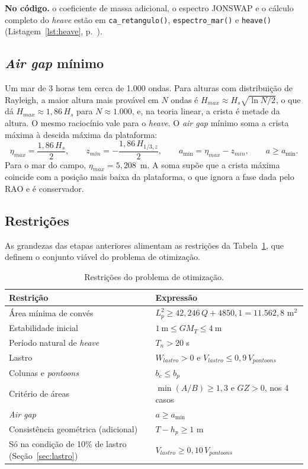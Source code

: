 \documentclass[11pt,a4paper]{article}
\newcommand{\notacodigo}[1]{\begin{nocodigo}\textbf{\sffamily\color{azul}No código.} #1\end{nocodigo}}
\newcommand{\lst}[1]{Listagem~\ref{lst:#1}, p.~\pageref{lst:#1}}
\newcommand{\Hz}{H_{1/3,z}}
\newcommand{\amin}{a_{\text{mín}}}
\begin{document}
\notacodigo{o coeficiente de massa adicional, o espectro JONSWAP e o cálculo completo do \emph{heave}
estão em \texttt{ca\_retangulo()}, \texttt{espectro\_mar()} e \texttt{heave()} (\lst{heave}).}

\subsection{\emph{Air gap} mínimo}\label{sec:airgap-teoria}

Um mar de 3 horas tem cerca de 1.000 ondas. Para alturas com distribuição de Rayleigh, a maior
altura mais provável em $N$ ondas é $H_{max} \approx H_s\sqrt{\ln N/2}$, o que dá
$H_{max} \approx 1{,}86\,H_s$ para $N \approx 1.000$, e, na teoria linear, a crista é metade da
altura. O mesmo raciocínio vale para o \emph{heave}. O \emph{air gap} mínimo soma a crista máxima
à descida máxima da plataforma:
\begin{equation}
\eta_{max} = \frac{1{,}86\, H_s}{2}, \qquad z_{min} = -\frac{1{,}86\,\Hz}{2}, \qquad
\amin = \eta_{max} - z_{min}, \qquad a \ge \amin .
\end{equation}
Para o mar do campo, $\eta_{max} = 5{,}208$~m. A soma supõe que a crista máxima coincide com a
posição mais baixa da plataforma, o que ignora a fase dada pelo RAO e é conservador.

\subsection{Restrições}\label{sec:restricoes}

As grandezas das etapas anteriores alimentam as restrições da Tabela~\ref{tab:restricoes}, que
definem o conjunto viável do problema de otimização.

\begin{table}[!htb]
\centering
\caption{Restrições do problema de otimização.}\label{tab:restricoes}
\begin{tabular}{ll}
\toprule
Restrição & Expressão \\
\midrule
Área mínima de convés & $L_p^2 \ge 42{,}246\,Q + 4850{,}1 = 11.562{,}8$ m$^2$ \\
Estabilidade inicial & $1~\text{m} \le GM_T \le 4~\text{m}$ \\
Período natural de \emph{heave} & $T_n > 20$ s \\
Lastro & $W_{lastro} > 0$ e $V_{lastro} \le 0{,}9\, V_{pontoons}$ \\
Colunas e \emph{pontoons} & $b_c \le b_p$ \\
Critério de áreas & $\min(A/B) \ge 1{,}3$ e $GZ > 0$, nos 4 casos \\
\emph{Air gap} & $a \ge \amin$ \\
Consistência geométrica (adicional) & $T - h_p \ge 1$ m \\
\midrule
Só na condição de 10\% de lastro (Seção~\ref{sec:lastro}) & $V_{lastro} \ge 0{,}10\, V_{pontoons}$ \\
\bottomrule
\end{tabular}
\end{table}
\end{document}
